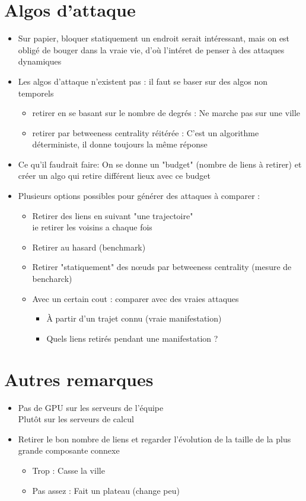 \documentclass{article}
\begin{document}
\section*{Algos d'attaque}
\begin{itemize}
	\item Sur papier, bloquer statiquement un endroit serait intéressant, mais on est obligé de bouger dans la vraie vie, d'où l'intéret de penser à des attaques dynamiques
	\item Les algos d'attaque n'existent pas : il faut se baser sur des algos non temporels %
	\begin{itemize}
		\item retirer en se basant sur le nombre de degrés : Ne marche pas sur une ville
		\item retirer par betweeness centrality réitérée : C'est un algorithme déterministe, il donne toujours la même réponse
	\end{itemize}
	\item Ce qu'il faudrait faire: On se donne un "budget" (nombre de liens à retirer) et créer un algo qui retire différent lieux avec ce budget
	\item Plusieurs options possibles pour générer des attaques à comparer  :
	\begin{itemize}
		\item Retirer des liens en suivant "une trajectoire" \\
	  	ie retirer les voisins a chaque fois
	  	\item Retirer au hasard (benchmark)
	  	\item Retirer "statiquement" des nœuds par betweeness centrality (mesure de bencharck)
	  	\item Avec un certain cout : comparer avec des vraies attaques 
	  	\begin{itemize}
	  		\item À partir d'un trajet connu (vraie manifestation)
	  		\item Quels liens retirés pendant une manifestation ?  
	  	\end{itemize}
	\end{itemize}
\end{itemize}

\section*{Autres remarques}
\begin{itemize}
	\item Pas de GPU sur les serveurs de l'équipe \\
	Plutôt sur les serveurs de calcul
	\item Retirer le bon nombre de liens et regarder l'évolution de la taille de la plus grande composante connexe
	\begin{itemize}
		\item Trop : Casse la ville
		\item Pas assez : Fait un plateau (change peu)
	\end{itemize}
\end{itemize}
\end{document}
